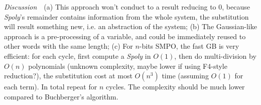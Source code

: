 \textit{Discussion}\ \ (a) This approach won't conduct to a result reducing to 0, because \emph{Spoly}'s remainder contains information from the whole system,
the substitution will result something new, i.e. an abstraction of the system; (b) The Gaussian-like approach is a pre-processing of a variable, and could be immediately reused
to other words with the same length; (c) For $n$-bits SMPO, the fast GB is very efficient: for each cycle, first compute a \emph{Spoly} in $O(1)$, then do multi-division by $O(n)$ polynomials
(unknown complexity, maybe lower if using F4-style reduction?), the substitution cost at most $O(n^3)$ time (assuming $O(1)$ for each term). In total repeat for $n$ cycles.
The complexity should be much lower compared to Buchberger's algorithm.
%
%
